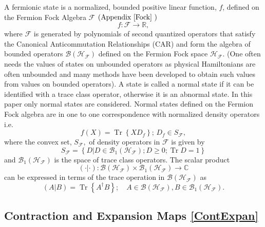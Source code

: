 \documentclass[aps,preprint]{revtex4}%
\begin{document}
A fermionic state is a normalized, bounded positive linear function, $f$,
defined on the Fermion Fock Algebra $\mathcal{F}$ $\left(  \text{Appendix
\ref{Fock} }\right)  $
\begin{equation}
f:\mathcal{F\rightarrow}\mathbb{R},
\end{equation}
where $\mathcal{F}$ is generated by polynomials of second quantized operators
that satisfy the Canonical Anticommutation Relationships (CAR) and form the
algebra of bounded operators $\mathcal{B}\left(  \mathcal{H}_{\mathcal{F}%
}\right)  $ defined on the Fermion Fock space $\mathcal{H}_{\mathcal{F}}.$
(One often needs the values of states on unbounded operators as physical
Hamiltonians are often unbounded and many methods have been developed to
obtain such values from values on bounded operators). A state is called a
normal state if it can be identified with a trace class operator, otherwise it
is an abnormal state. In this paper only normal states are considered. Normal
states defined on the Fermion Fock algebra are in one to one correspondence
with normalized density operators i.e.
\begin{equation}
f\left(  X\right)  =\operatorname*{Tr}\left\{  XD_{f}\right\}  ;\,D_{f}\in
S_{\mathcal{F}},
\end{equation}
where the convex set, $S_{\mathcal{F}},$ of density operators in $\mathcal{F}$
is given by
\begin{equation}
S_{\mathcal{F}}=\left\{  D\left\vert D\in\mathcal{B}_{1}\left(  \mathcal{H}%
_{\mathcal{F}}\right)  ;D\geq0;\operatorname{Tr}D=1\right.  \right\}
\end{equation}
and $\mathcal{B}_{1}\left(  \mathcal{H}_{\mathcal{F}}\right)  $ is the space
of trace class operators. The scalar product%
\begin{equation}
\left(  \left.  \cdot\right\vert \left.  \cdot\right.  \right)  :\mathcal{B}%
\left(  \mathcal{H}_{\mathcal{F}}\right)  \times\mathcal{B}_{1}\left(
\mathcal{H}_{\mathcal{F}}\right)  \rightarrow\mathbb{C}%
\end{equation}
can be expressed in terms of the trace operation in $\mathcal{B}\left(
\mathcal{H}_{\mathcal{F}}\right)  $ as
\begin{equation}
\left(  \left.  A\right\vert B\right)  =\operatorname*{Tr}\left\{  A^{\dagger
}B\right\}  ;\quad A\in\mathcal{B}\left(  \mathcal{H}_{\mathcal{F}}\right)
,B\in\mathcal{B}_{1}\left(  \mathcal{H}_{\mathcal{F}}\right)  .
\end{equation}


\subsection{Contraction and Expansion Maps \ref{ContExpan}}
\end{document}
